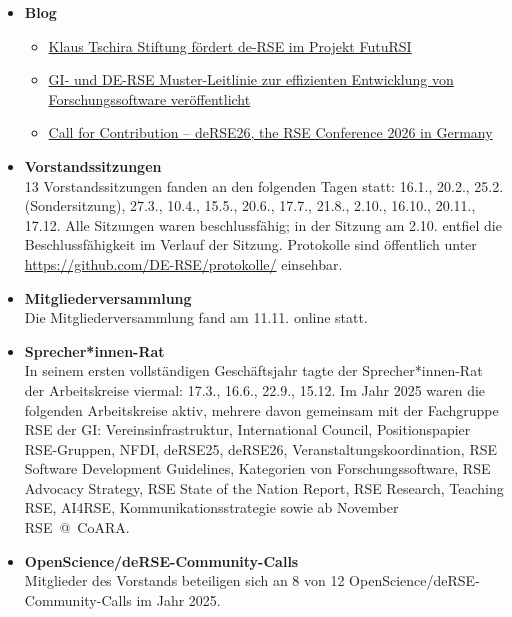 \begin{itemize}
 \item[] \textbf{Blog}
 \begin{itemize}
  \item \href{https://de-rse.org/blog/2025/01/20/kts_foerderung.html}{Klaus Tschira Stiftung fördert de-RSE im Projekt FutuRSI}
  \item \href{https://de-rse.org/blog/2025/02/11/musterleitlinie.html}{GI- und DE-RSE Muster-Leitlinie zur effizienten Entwicklung von Forschungssoftware veröffentlicht}
  \item \href{https://de-rse.org/blog/2025/09/22/deRSE26-call-for-contribution.html}{Call for Contribution -- deRSE26, the RSE Conference 2026 in Germany}
 \end{itemize}
 \item[] \textbf{Vorstandssitzungen}\\
  13 Vorstandssitzungen fanden an den folgenden Tagen statt: 16.1., 20.2., 25.2. (Sondersitzung),
  27.3., 10.4., 15.5., 20.6., 17.7., 21.8., 2.10., 16.10., 20.11., 17.12.
  Alle Sitzungen waren beschlussfähig; in der Sitzung am 2.10. entfiel die Beschlussfähigkeit im
  Verlauf der Sitzung.
  Protokolle sind öffentlich unter \href{https://github.com/DE-RSE/protokolle/}{https://github.com/DE-RSE/protokolle/} einsehbar.
 \item[] \textbf{Mitgliederversammlung}\\
  Die Mitgliederversammlung fand am 11.11. online statt.
 \item[] \textbf{Sprecher*innen-Rat}\\
  In seinem ersten vollständigen Geschäftsjahr tagte der Sprecher*innen-Rat der Arbeitskreise
  viermal: 17.3., 16.6., 22.9., 15.12.
  Im Jahr 2025 waren die folgenden Arbeitskreise aktiv, mehrere davon gemeinsam mit der Fachgruppe RSE
  der GI: Vereinsinfrastruktur, International Council, Positionspapier RSE-Gruppen, NFDI, deRSE25,
  deRSE26, Veranstaltungskoordination, RSE Software Development Guidelines, Kategorien von
  Forschungssoftware, RSE Advocacy Strategy, RSE State of the Nation Report, RSE Research, Teaching
  RSE, AI4RSE, Kommunikationsstrategie sowie ab November RSE~@~CoARA.
 \item[] \textbf{OpenScience/deRSE-Community-Calls}\\
 Mitglieder des Vorstands beteiligen sich an 8 von 12 OpenScience/deRSE-Community-Calls im Jahr 2025.
\end{itemize}




